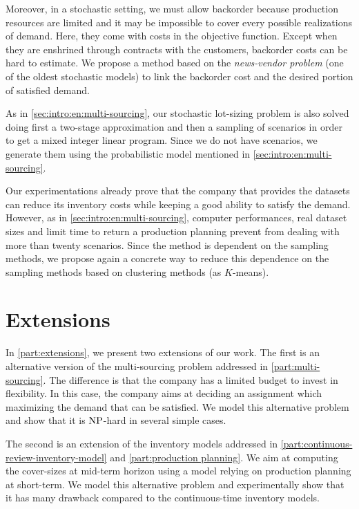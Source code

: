 Moreover, in a stochastic setting, we must allow backorder because production resources are limited and it may be impossible to cover every possible realizations of demand.
Here, they come with costs in the objective function.
Except when they are enshrined through contracts with the customers, backorder costs can be hard to estimate.
We propose a method based on the \emph{news-vendor problem} (one of the oldest stochastic models) to link the backorder cost and the desired portion of satisfied demand.


As in \cref{sec:intro:en:multi-sourcing}, our stochastic lot-sizing problem is also solved doing first a two-stage approximation and then a sampling of scenarios in order to get a mixed integer linear program.
Since we do not have scenarios, we generate them using the probabilistic model mentioned in \cref{sec:intro:en:multi-sourcing}.


\medskip


Our experimentations already prove that the company that provides the datasets can reduce its inventory costs while keeping a good ability to satisfy the demand.
However, as in \cref{sec:intro:en:multi-sourcing}, computer performances, real dataset sizes and limit time to return a production planning prevent from dealing with more than twenty scenarios.
Since the method is dependent on the sampling methods, we propose again a concrete way to reduce this dependence on the sampling methods based on clustering methods (as $K$-means).


\section{Extensions}


In \cref{part:extensions}, we present two extensions of our work.
The first is an alternative version of the multi-sourcing problem addressed in \cref{part:multi-sourcing}.
The difference is that the company has a limited budget to invest in flexibility.
In this case, the company aims at deciding an assignment which maximizing the demand that can be satisfied.
We model this alternative problem and show that it is $\operatorname{NP}$-hard in several simple cases.


The second is an extension of the inventory models addressed in \cref{part:continuous-review-inventory-model} and \ref{part:production planning}.
We aim at computing the cover-sizes at mid-term horizon using a model relying on production planning at short-term.
We model this alternative problem and experimentally show that it has many drawback compared to the continuous-time inventory models.

